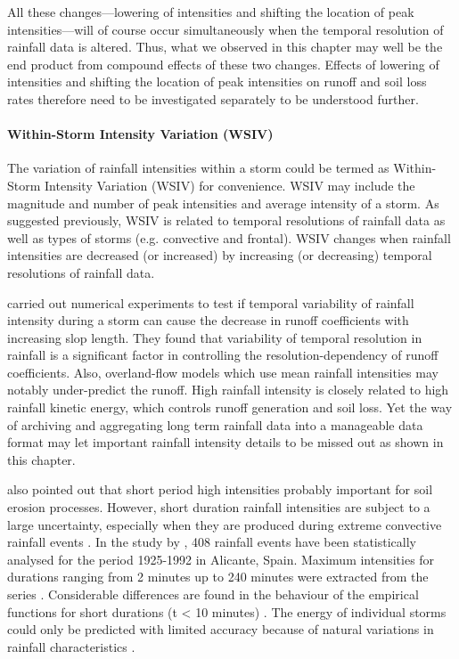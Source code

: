 All these changes---lowering of intensities and shifting the location of peak
intensities---will of course occur simultaneously when the temporal resolution
of
rainfall data is altered. Thus, what we observed in this chapter may well be the
end product from compound effects of these two changes. Effects of lowering of
intensities and shifting the location of peak intensities on runoff and
soil loss rates therefore need to be investigated separately to be understood
further.

\paragraph{Within-Storm Intensity Variation (WSIV)} The variation of rainfall
intensities within a storm could be termed as Within-Storm Intensity Variation
(WSIV) for convenience. WSIV may include the magnitude and number of peak
intensities and average intensity of a storm. As suggested previously, WSIV is
related to temporal resolutions of rainfall data as well as types of storms
(e.g.
convective and frontal). WSIV changes when rainfall intensities are decreased
(or increased) by increasing (or decreasing) temporal resolutions of rainfall
data.

\citet{wainwright2002-1271} carried out numerical experiments to test if
temporal variability of rainfall intensity during a storm can cause the decrease
in runoff coefficients with increasing slop length. They found that variability
of temporal resolution in rainfall is a significant factor in controlling the
resolution-dependency of runoff coefficients. Also, overland-flow models which
use
mean rainfall intensities may notably under-predict the runoff.
High rainfall intensity is closely related to high rainfall kinetic energy,
which controls runoff generation and soil loss. Yet the way of archiving and
aggregating long term rainfall data into a manageable data format may let
important rainfall intensity details to be missed out as shown in this chapter.

\citet{boardman1987-36} also pointed out that
short period high intensities probably important for soil erosion processes.
However, short duration rainfall intensities are subject to a large uncertainty,
especially when they are produced during extreme convective rainfall events
\citep{garcia2001-675}. In the study by \citet{garcia2001-675}, 408 rainfall
events have been statistically analysed for the period 1925-1992 in Alicante,
Spain. Maximum intensities for durations ranging from 2 minutes up to 240
minutes were extracted from the series \citep{garcia2001-675}. Considerable
differences are found in the behaviour of the empirical functions for short
durations (t < 10 minutes) \citep{garcia2001-675}. The energy of individual
storms could only be predicted with limited accuracy because of natural
variations in rainfall characteristics \citep{vandijk2002-1}.

